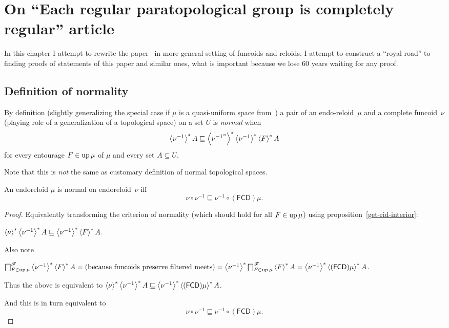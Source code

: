 \chapter{On ``Each regular paratopological group is completely regular'' article}

In this chapter I attempt to rewrite the paper~\cite{2014arXiv1410.1504B} in more general setting of funcoids and reloids.
I attempt to construct a ``royal road'' to finding proofs of statements of this paper and similar ones, what is
important because we lose 60 years waiting for any proof.

\section{Definition of normality}

By definition (slightly generalizing the special case if $\mu$ is a
quasi-uniform space from~\cite{2014arXiv1410.1504B})
a pair of an endo-reloid~$\mu$ and a complete funcoid~$\nu$ (playing role of a generalization of a topological space)
on a set $U$ is \emph{normal} when
\[ \left\langle \nu^{-1}\right\rangle ^{\ast} A \sqsubseteq \left\langle 
{\nu^{-1}}^{\circ}\right\rangle ^{\ast} \left\langle \nu^{-1}\right\rangle ^{\ast} \left\langle F\right\rangle ^{\ast} A \] for every entourage $F \in
\operatorname{up} \mu$ of $\mu$ and every set $A \subseteq U$.

Note that this is \emph{not} the same as customary definition of normal topological spaces.

\begin{thm}
  An endoreloid $\mu$ is normal on endoreloid~$\nu$ iff
  \[ \nu \circ \nu^{-1} \sqsubseteq
  \nu^{-1} \circ (\mathsf{FCD}) \mu. \]
\end{thm}

\begin{proof}
  Equivalently transforming the criterion of normality (which should hold for
  all $F \in \operatorname{up} \mu$) using proposition~\ref{get-rid-interior}:

  $\left\langle \nu\right\rangle ^{\ast}
  \left\langle \nu^{-1}\right\rangle ^{\ast} A \sqsubseteq
  \left\langle \nu^{-1}\right\rangle ^{\ast} \left\langle F\right\rangle ^{\ast} A$.

  Also note
  
  $\bigsqcap^{\mathscr{F}}_{F \in \operatorname{up} \mu} \left\langle  \nu^{-1}
  \right\rangle ^{\ast} \left\langle F\right\rangle ^{\ast} A = \text{(because funcoids preserve
  filtered meets)} = \left\langle  \nu^{-1}
  \right\rangle ^{\ast}  \bigsqcap^{\mathscr{F}}_{F \in \operatorname{up} \mu} \left\langle F\right\rangle ^{\ast} A =
  \left\langle  \nu^{-1} \right\rangle ^{\ast}
  \left\langle  (\mathsf{FCD}) \mu \right\rangle ^{\ast} A$.

  Thus the above is equivalent to
  $\left\langle \nu\right\rangle ^{\ast}
  \left\langle \nu^{-1}\right\rangle ^{\ast} A \sqsubseteq
  \left\langle  \nu^{-1} \right\rangle ^{\ast}
  \left\langle  (\mathsf{FCD}) \mu \right\rangle ^{\ast} A$.

  And this is in turn equivalent to
  \[ \nu \circ \nu^{-1} \sqsubseteq
  \nu^{-1} \circ (\mathsf{FCD}) \mu. \]
\end{proof}

